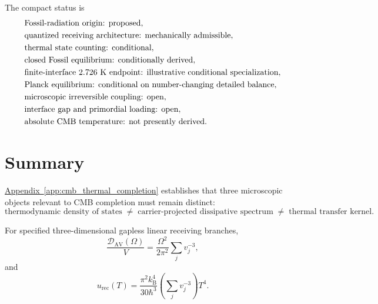 The compact status is
\begin{equation}
    \begin{aligned}
        &\text{Fossil-radiation origin: proposed},
        \\
        &\text{quantized receiving architecture: mechanically admissible},
        \\
        &\text{thermal state counting: conditional},
        \\
        &\text{closed Fossil equilibrium: conditionally derived},
        \\
        &\text{finite-interface }2.726~{\rm K}
        \text{ endpoint: illustrative conditional specialization},
        \\
        &\text{Planck equilibrium: conditional on number-changing
        detailed balance},
        \\
        &\text{microscopic irreversible coupling: open},
        \\
        &\text{interface gap and primordial loading: open},
        \\
        &\text{absolute CMB temperature: not presently derived}.
    \end{aligned}
    \label{eq:AT_status_summary}
\end{equation}


\section{Summary}

\hyperref[app:cmb_thermal_completion]{Appendix~\ref*{app:cmb_thermal_completion}} establishes that three microscopic objects relevant to CMB
completion must remain distinct:
\begin{equation}
    \text{thermodynamic density of states}
    \;\neq\;
    \text{carrier-projected dissipative spectrum}
    \;\neq\;
    \text{thermal transfer kernel}.
    \label{eq:AT_summary_three_objects}
\end{equation}

For specified three-dimensional gapless linear receiving branches,
\begin{equation}
    \frac{
        \mathcal D_{\mathrm{AV}}(\Omega)
    }{
        V
    }
    =
    \frac{
        \Omega^2
    }{
        2\pi^2
    }
    \sum_j
    v_j^{-3},
\end{equation}
and
\begin{equation}
    u_{\mathrm{rec}}(T)
    =
    \frac{
        \pi^2k_{\mathrm B}^4
    }{
        30\hbar^3
    }
    \left(
        \sum_j
        v_j^{-3}
    \right)
    T^4.
    \label{eq:AT_summary_receiver_thermodynamics}
\end{equation}

